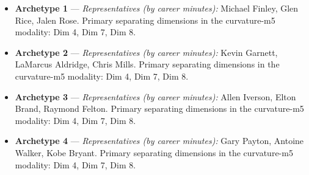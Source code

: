 \begin{itemize}
\item \textbf{Archetype 1} --- \emph{Representatives (by career minutes):} Michael Finley, Glen Rice, Jalen Rose. Primary separating dimensions in the curvature-m5 modality: Dim 4, Dim 7, Dim 8.
\item \textbf{Archetype 2} --- \emph{Representatives (by career minutes):} Kevin Garnett, LaMarcus Aldridge, Chris Mills. Primary separating dimensions in the curvature-m5 modality: Dim 4, Dim 7, Dim 8.
\item \textbf{Archetype 3} --- \emph{Representatives (by career minutes):} Allen Iverson, Elton Brand, Raymond Felton. Primary separating dimensions in the curvature-m5 modality: Dim 4, Dim 7, Dim 8.
\item \textbf{Archetype 4} --- \emph{Representatives (by career minutes):} Gary Payton, Antoine Walker, Kobe Bryant. Primary separating dimensions in the curvature-m5 modality: Dim 4, Dim 7, Dim 8.
\end{itemize}
